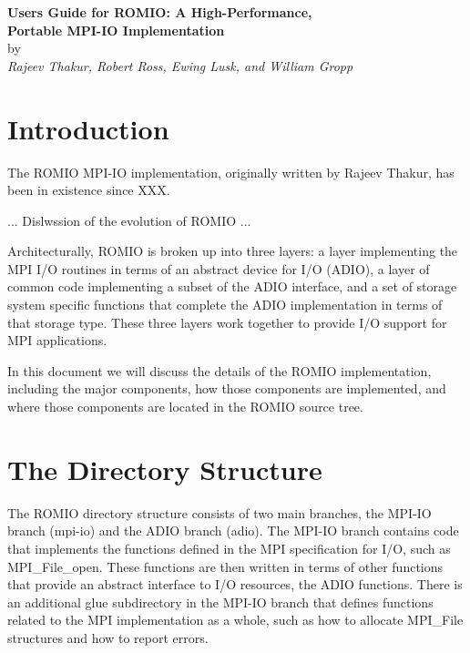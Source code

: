 \tableofcontents
\thispagestyle{empty}
\newpage

\setcounter{page}{1}
\begin{center}
{\bf Users Guide for ROMIO:  A High-Performance,\\[1ex]
Portable MPI-IO Implementation} \\ [2ex]
by \\ [2ex]
{\it Rajeev Thakur, Robert Ross, Ewing Lusk, and William Gropp}

\end{center}
\begin{abstract}
\noindent
ROMIO is a high-performance, portable implementation of MPI-IO (the
I/O chapter in the \mbox{MPI Standard}).
This document describes the internals of the ROMIO implementation.
\end{abstract}

\section{Introduction}

The ROMIO MPI-IO implementation, originally written by Rajeev Thakur, has been
in existence since XXX.

... Dislwssion of the evolution of ROMIO ...

Architecturally, ROMIO is broken up into three layers: a layer implementing
the MPI I/O routines in terms of an abstract device for I/O (ADIO), a layer of
common code implementing a subset of the ADIO interface, and a set of storage
system specific functions that complete the ADIO implementation in terms of
that storage type.  These three layers work together to provide I/O support
for MPI applications.

In this document we will discuss the details of the ROMIO implementation,
including the major components, how those components are implemented, and
where those components are located in the ROMIO source tree.

\section{The Directory Structure}

The ROMIO directory structure consists of two main branches, the MPI-IO branch
(mpi-io) and the ADIO branch (adio).  The MPI-IO branch contains code that
implements the functions defined in the MPI specification for I/O, such as
MPI\_File\_open.  These functions are then written in terms of other functions
that provide an abstract interface to I/O resources, the ADIO functions.
There is an additional glue subdirectory in the MPI-IO branch that defines
functions related to the MPI implementation as a whole, such as how to
allocate MPI\_File structures and how to report errors.

